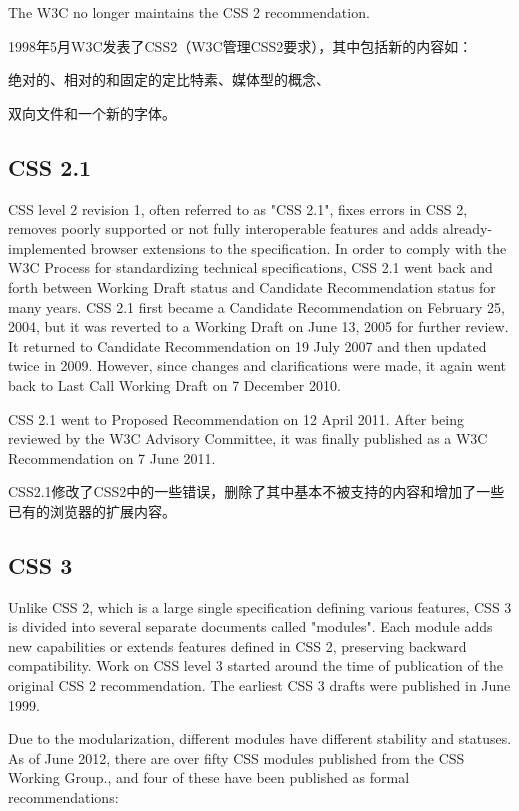 The W3C no longer maintains the CSS 2 recommendation.

1998年5月W3C发表了CSS2（W3C管理CSS2要求），其中包括新的内容如：

\begin{compactitem}
\item 绝对的、相对的和固定的定比特素、媒体型的概念、
\item 双向文件和一个新的字体。
\end{compactitem}

\subsection{CSS 2.1}


CSS level 2 revision 1, often referred to as "CSS 2.1", fixes errors in CSS 2, removes poorly supported or not fully interoperable features and adds already-implemented browser extensions to the specification. In order to comply with the W3C Process for standardizing technical specifications, CSS 2.1 went back and forth between Working Draft status and Candidate Recommendation status for many years. CSS 2.1 first became a Candidate Recommendation on February 25, 2004, but it was reverted to a Working Draft on June 13, 2005 for further review. It returned to Candidate Recommendation on 19 July 2007 and then updated twice in 2009. However, since changes and clarifications were made, it again went back to Last Call Working Draft on 7 December 2010.

CSS 2.1 went to Proposed Recommendation on 12 April 2011. After being reviewed by the W3C Advisory Committee, it was finally published as a W3C Recommendation on 7 June 2011.


CSS2.1修改了CSS2中的一些错误，删除了其中基本不被支持的内容和增加了一些已有的浏览器的扩展内容。


\subsection{CSS 3}

Unlike CSS 2, which is a large single specification defining various features, CSS 3 is divided into several separate documents called "modules". Each module adds new capabilities or extends features defined in CSS 2, preserving backward compatibility. Work on CSS level 3 started around the time of publication of the original CSS 2 recommendation. The earliest CSS 3 drafts were published in June 1999.


Due to the modularization, different modules have different stability and statuses. As of June 2012, there are over fifty CSS modules published from the CSS Working Group., and four of these have been published as formal recommendations:

